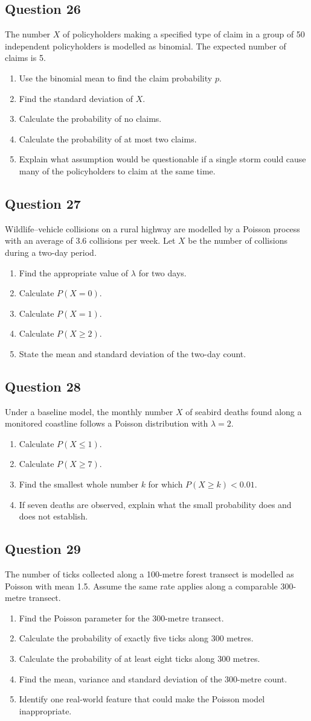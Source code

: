 \documentclass[10pt,letterpaper]{article}
\newcommand{\questionheading}[1]{%
  \subsection*{Question #1}
}
\begin{document}
\questionheading{26}
The number $X$ of policyholders making a specified type of claim in a group of 50 independent policyholders is modelled as binomial. The expected number of claims is 5.
\begin{enumerate}
	\item Use the binomial mean to find the claim probability $p$.
	\item Find the standard deviation of $X$.
	\item Calculate the probability of no claims.
		\item Calculate the probability of at most two claims.
	\item Explain what assumption would be questionable if a single storm could cause many of the policyholders to claim at the same time.
\end{enumerate}

\questionheading{27}
Wildlife--vehicle collisions on a rural highway are modelled by a Poisson process with an average of 3.6 collisions per week. Let $X$ be the number of collisions during a two-day period.
\begin{enumerate}
	\item Find the appropriate value of $\lambda$ for two days.
	\item Calculate $P(X=0)$.
	\item Calculate $P(X=1)$.
	\item Calculate $P(X\geq2)$.
	\item State the mean and standard deviation of the two-day count.
\end{enumerate}

\questionheading{28}
Under a baseline model, the monthly number $X$ of seabird deaths found along a monitored coastline follows a Poisson distribution with $\lambda=2$.
\begin{enumerate}
	\item Calculate $P(X\leq1)$.
	\item Calculate $P(X\geq7)$.
	\item Find the smallest whole number $k$ for which $P(X\geq k)<0.01$.
	\item If seven deaths are observed, explain what the small probability does and does not establish.
\end{enumerate}

\newpage

\questionheading{29}
The number of ticks collected along a 100-metre forest transect is modelled as Poisson with mean 1.5. Assume the same rate applies along a comparable 300-metre transect.
\begin{enumerate}
	\item Find the Poisson parameter for the 300-metre transect.
	\item Calculate the probability of exactly five ticks along 300 metres.
	\item Calculate the probability of at least eight ticks along 300 metres.
	\item Find the mean, variance and standard deviation of the 300-metre count.
	\item Identify one real-world feature that could make the Poisson model inappropriate.
\end{enumerate}
\end{document}

